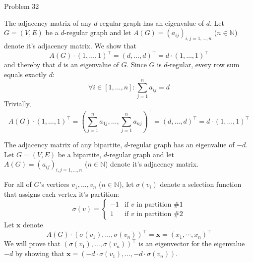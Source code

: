 \documentclass[a4paper]{article}
\begin{document}
	\begin{solution}{Problem 32}
		\begin{theorem}{The adjacency matrix of any $d$-regular graph has an eigenvalue of $d$.}
			Let $G = (V, E)$ be a $d$-regular graph and let $A(G) = (a_{ij})_{i, j = 1,\dots, n}$ ($n \in \mathbb{N}$) denote it's adjacency matrix. We show that
				\begin{equation*}
					A(G) \cdot (1, \dots ,1)^{\top} = (d,  \dots ,d)^{\top} = d \cdot (1,  \dots ,1)^{\top}
				\end{equation*}
			and thereby that $d$ is an eigenvalue of $G$. Since $G$ is $d$-regular, every row sum equals exactly $d$:
				\begin{equation*}
					\forall i \in [1, \dots, n]: \sum_{j=1}^{n} a_{ij} = d
				\end{equation*}
			Trivially,
				\begin{equation*}
					A(G) \cdot (1, \dots ,1)^{\top} =  (\sum_{j=1}^{n} a_{1j},  \dots , \sum_{j=1}^{n} a_{nj})^{\top} = (d, \dots, d)^\top = d \cdot (1,  \dots ,1)^{\top}
				\end{equation*}
		\end{theorem}

		\begin{theorem}{The adjacency matrix of any bipartite, $d$-regular graph has an eigenvalue of $-d$.}
			Let $G = (V, E)$ be a bipartite, $d$-regular graph and let $A(G) = (a_{ij})_{i, j = 1,\dots, n}$ ($n \in \mathbb{N}$) denote it's adjacency matrix.
			
			For all of $G$'s vertices $v_1, ..., v_n$ ($n \in \mathbb{N}$), let $\sigma(v_i)$ denote a selection function that assigns each vertex it's partition:
\[
 \sigma(v) =
  \begin{cases}
   -1 & \text{if } v \text{ in partition \#1}\\
   1 & \text{if } v \text{ in partition \#2}
  \end{cases}
\]
Let $\mathbf{x}$ denote
	\begin{equation*}
		A(G) \cdot (\sigma(v_1), \dots, \sigma(v_n))^\top = \mathbf{x} = (x_1, \cdots, x_n)^\top
	\end{equation*}
We will prove that $(\sigma(v_1), \dots, \sigma(v_n))^\top$ is an eigenvector for the eigenvalue $-d$ by showing that $\mathbf{x} = (-d \cdot \sigma(v_1), \dots, -d \cdot \sigma(v_n))$.\\


\end{theorem}
\end{solution}
\end{document}
